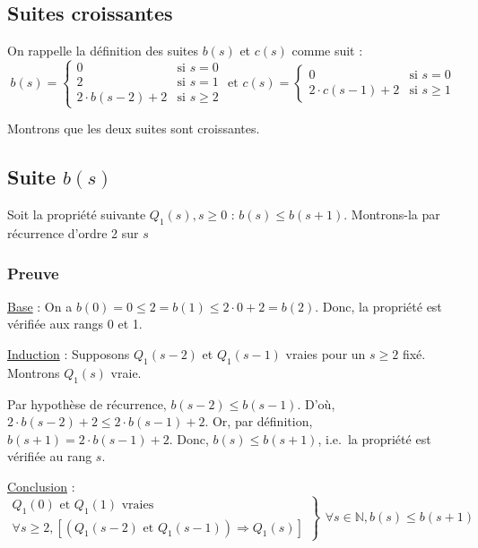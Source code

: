 \documentclass[12pt,a4paper]{article}
\begin{document}
\newpage
\begin{appendices}
 \section{Suites croissantes}
 \label{appendix:suites}
 On rappelle la d\'efinition des suites $b(s)$ et $c(s)$ comme suit :
\begin{equation*}
\left .b(s) = \begin{cases} 
      0 & \text{si } s = 0 \\
      2 & \text{si } s = 1 \\
      2\cdot b(s-2) + 2 & \text{si } s\geq 2 
   \end{cases} \right.
   \text{ et }
\left .c(s) = \begin{cases} 
      0 & \text{si } s = 0 \\
      2\cdot c(s-1) + 2 & \text{si } s\geq 1 
   \end{cases} \right.
\end{equation*}

Montrons que les deux suites sont croissantes.

\subsection*{Suite $b(s)$}
Soit la propri\'et\'e suivante $Q_{1}(s), s \geq 0$ : $b(s) \leq b(s+1)$.
Montrons-la par r\'ecurrence d'ordre 2 sur $s$

\subsubsection*{Preuve}
\underline{Base} : On a $b(0) = 0 \leq 2 = b(1) \leq 2\cdot 0 + 2 = b(2)$. 
Donc, la propri\'et\'e est v\'erifi\'ee aux rangs 0 et 1.

\medskip
\underline{Induction} : Supposons $Q_{1}(s-2)$ et $Q_{1}(s-1)$ vraies pour un $s \geq 2$ fix\'e. 
Montrons $Q_{1}(s)$ vraie.

\smallskip
Par hypoth\`ese de r\'ecurrence, $b(s-2) \leq b(s-1)$. D'o\`u, $2\cdot b(s-2)+2 \leq 2\cdot b(s-1)+2$.
Or, par d\'efinition, $b(s+1) = 2\cdot b(s-1) + 2$.
Donc, $b(s) \leq b(s+1)$, i.e.\ la propri\'et\'e est v\'erifi\'ee au rang $s$.

\medskip
\underline{Conclusion} : 
\begin{equation*}
\left .\begin{array}{l}
Q_{1}(0) \text{ et } Q_{1}(1) \text{ vraies } \\
\forall s \geq 2, [(Q_{1}(s-2) \text{ et } Q_{1}(s-1)) \Rightarrow Q_{1}(s) ]
\end{array} \right \}
\left .\begin{array}{l}
\forall s \in \mathbb{N}, b(s) \leq b(s+1)
\end{array}\right .
\end{equation*}


\end{appendices}
\end{document}

